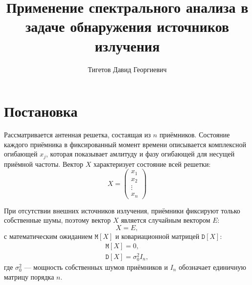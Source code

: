 \documentclass[a4paper,12pt]{article}
\newcommand{\expectation}[1]{\mathtt{M} \left[ #1 \right]}
\newcommand{\variance}[1]{\mathtt{D} \left[ #1 \right]}
\begin{document}
    \title{Применение спектрального анализа в задаче обнаружения источников излучения}
    \author{Тигетов Давид Георгиевич}
    \maketitle


    \section{Постановка}

    Рассматривается антенная решетка, состаящая из $n$ приёмников. Состояние каждого приёмника в фиксированный момент времени описывается комплексной огибающей $x_j$,
    которая показывает амлитуду и фазу огибающей для несущей приёмной частоты. Вектор $X$ характеризует состояние всей решетки:
    \[
        X
        = \begin{pmatrix}
              x_1    \\
              x_2    \\
              \vdots \\
              x_n
        \end{pmatrix}
    \]

    При отсутствии внешних источников излучения, приёмники фиксируют только собственные шумы, поэтому вектор $X$ является случайным вектором $E$:
    \[
        X = E ,
    \]
    с математическим ожиданием $\expectation{X}$ и ковариационной матрицей $\variance{X}$:
    \begin{gather*}
        \expectation{X} = 0 , \\
        \variance{X} = \sigma_0^2 I_n,
    \end{gather*}
    где $\sigma_0^2$ --- мощность собственных шумов приёмников и $I_n$ обозначает единичную матрицу порядка $n$.
\end{document}
